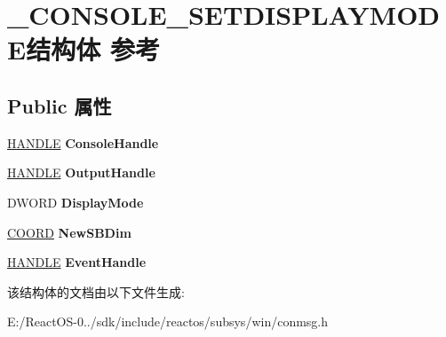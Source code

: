 \hypertarget{struct___c_o_n_s_o_l_e___s_e_t_d_i_s_p_l_a_y_m_o_d_e}{}\section{\+\_\+\+C\+O\+N\+S\+O\+L\+E\+\_\+\+S\+E\+T\+D\+I\+S\+P\+L\+A\+Y\+M\+O\+D\+E结构体 参考}
\label{struct___c_o_n_s_o_l_e___s_e_t_d_i_s_p_l_a_y_m_o_d_e}
\subsection*{Public 属性}
\begin{DoxyCompactItemize}
\item 
\mbox{\label{struct___c_o_n_s_o_l_e___s_e_t_d_i_s_p_l_a_y_m_o_d_e_a6762fee5263eb6609d089a3ce069a983}} 
\hyperlink{interfacevoid}{H\+A\+N\+D\+LE} {\bfseries Console\+Handle}
\item 
\mbox{\label{struct___c_o_n_s_o_l_e___s_e_t_d_i_s_p_l_a_y_m_o_d_e_a280190ff1b4d065fddf1afb6b41617ac}} 
\hyperlink{interfacevoid}{H\+A\+N\+D\+LE} {\bfseries Output\+Handle}
\item 
\mbox{\label{struct___c_o_n_s_o_l_e___s_e_t_d_i_s_p_l_a_y_m_o_d_e_a1d7b740515012b090f5dfa76a15157b3}} 
D\+W\+O\+RD {\bfseries Display\+Mode}
\item 
\mbox{\label{struct___c_o_n_s_o_l_e___s_e_t_d_i_s_p_l_a_y_m_o_d_e_a521b6f7f199b52789726494e9e5eab64}} 
\hyperlink{struct___c_o_o_r_d}{C\+O\+O\+RD} {\bfseries New\+S\+B\+Dim}
\item 
\mbox{\label{struct___c_o_n_s_o_l_e___s_e_t_d_i_s_p_l_a_y_m_o_d_e_a45b1670115be6ab780bb6d3f3d4b87d5}} 
\hyperlink{interfacevoid}{H\+A\+N\+D\+LE} {\bfseries Event\+Handle}
\end{DoxyCompactItemize}


该结构体的文档由以下文件生成\+:\begin{DoxyCompactItemize}
\item 
E\+:/\+React\+O\+S-\/0../sdk/include/reactos/subsys/win/conmsg.\+h\end{DoxyCompactItemize}
